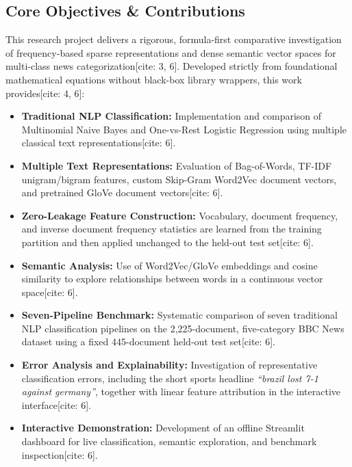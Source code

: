 \documentclass[11pt,a4paper]{article}
\begin{document}
	\subsection{Core Objectives \& Contributions}
	This research project delivers a rigorous, formula-first comparative investigation of frequency-based sparse representations and dense semantic vector spaces for multi-class news categorization[cite: 3, 6]. Developed strictly from foundational mathematical equations without black-box library wrappers, this work provides[cite: 4, 6]:
	\begin{itemize}[leftmargin=1.5em, itemsep=0.2em]
		\item \textbf{Traditional NLP Classification:} Implementation and comparison of Multinomial Naive Bayes and One-vs-Rest Logistic Regression using multiple classical text representations[cite: 6].
		\item \textbf{Multiple Text Representations:} Evaluation of Bag-of-Words, TF-IDF unigram/bigram features, custom Skip-Gram Word2Vec document vectors, and pretrained GloVe document vectors[cite: 6].
		\item \textbf{Zero-Leakage Feature Construction:} Vocabulary, document frequency, and inverse document frequency statistics are learned from the training partition and then applied unchanged to the held-out test set[cite: 6].
		\item \textbf{Semantic Analysis:} Use of Word2Vec/GloVe embeddings and cosine similarity to explore relationships between words in a continuous vector space[cite: 6].
		\item \textbf{Seven-Pipeline Benchmark:} Systematic comparison of seven traditional NLP classification pipelines on the 2,225-document, five-category BBC News dataset using a fixed 445-document held-out test set[cite: 6].
		\item \textbf{Error Analysis and Explainability:} Investigation of representative classification errors, including the short sports headline \textit{``brazil lost 7-1 against germany''}, together with linear feature attribution in the interactive interface[cite: 6].
		\item \textbf{Interactive Demonstration:} Development of an offline Streamlit dashboard for live classification, semantic exploration, and benchmark inspection[cite: 6].
	\end{itemize}
	
\end{document}
